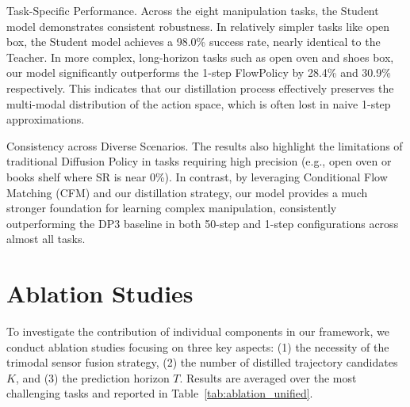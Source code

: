 Task-Specific Performance. Across the eight manipulation tasks, the Student model demonstrates consistent robustness. In relatively simpler tasks like open box, the Student model achieves a 98.0\% success rate, nearly identical to the Teacher. In more complex, long-horizon tasks such as open oven and shoes box, our model significantly outperforms the 1-step FlowPolicy by 28.4\% and 30.9\% respectively. This indicates that our distillation process effectively preserves the multi-modal distribution of the action space, which is often lost in naive 1-step approximations.

Consistency across Diverse Scenarios. The results also highlight the limitations of traditional Diffusion Policy in tasks requiring high precision (e.g., open oven or books shelf where SR is near 0\%). In contrast, by leveraging Conditional Flow Matching (CFM) and our distillation strategy, our model provides a much stronger foundation for learning complex manipulation, consistently outperforming the DP3 baseline in both 50-step and 1-step configurations across almost all tasks.

\section{Ablation Studies}
\label{sec:ablation}
To investigate the contribution of individual components in our framework, we conduct ablation studies focusing on three key aspects: (1) the necessity of the trimodal sensor fusion strategy, (2) the number of distilled trajectory candidates $K$, and (3) the prediction horizon $T$. Results are averaged over the most challenging tasks and reported in Table~\ref{tab:ablation_unified}.

